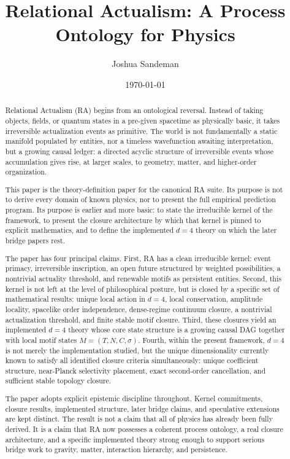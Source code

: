 \documentclass[11pt]{article}
\title{Relational Actualism: A Process Ontology for Physics}
\author{Joshua Sandeman}
\date{\today}
\begin{document}
\maketitle

\begin{abstract}
Relational Actualism (RA) begins from an ontological reversal. Instead of taking objects, fields, or quantum states in a pre-given spacetime as physically basic, it takes irreversible actualization events as primitive. The world is not fundamentally a static manifold populated by entities, nor a timeless wavefunction awaiting interpretation, but a growing causal ledger: a directed acyclic structure of irreversible events whose accumulation gives rise, at larger scales, to geometry, matter, and higher-order organization.

This paper is the theory-definition paper for the canonical RA suite. Its purpose is not to derive every domain of known physics, nor to present the full empirical prediction program. Its purpose is earlier and more basic: to state the irreducible kernel of the framework, to present the closure architecture by which that kernel is pinned to explicit mathematics, and to define the implemented $d=4$ theory on which the later bridge papers rest.

The paper has four principal claims. First, RA has a clean irreducible kernel: event primacy, irreversible inscription, an open future structured by weighted possibilities, a nontrivial actuality threshold, and renewable motifs as persistent entities. Second, this kernel is not left at the level of philosophical posture, but is closed by a specific set of mathematical results: unique local action in $d=4$, local conservation, amplitude locality, spacelike order independence, dense-regime continuum closure, a nontrivial actualization threshold, and finite stable motif closure. Third, these closures yield an implemented $d=4$ theory whose core state structure is a growing causal DAG together with local motif states $M=(T,N,C,\sigma)$. Fourth, within the present framework, $d=4$ is not merely the implementation studied, but the unique dimensionality currently known to satisfy all identified closure criteria simultaneously: unique coefficient structure, near-Planck selectivity placement, exact second-order cancellation, and sufficient stable topology closure.

The paper adopts explicit epistemic discipline throughout. Kernel commitments, closure results, implemented structure, later bridge claims, and speculative extensions are kept distinct. The result is not a claim that all of physics has already been fully derived. It is a claim that RA now possesses a coherent process ontology, a real closure architecture, and a specific implemented theory strong enough to support serious bridge work to gravity, matter, interaction hierarchy, and persistence.
\end{abstract}
\end{document}
